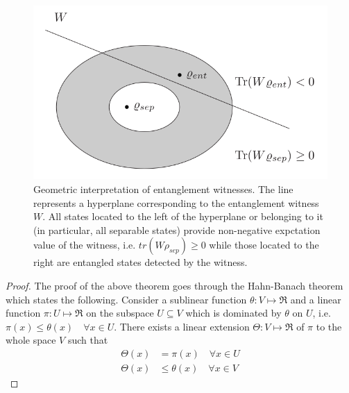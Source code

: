 \documentclass[10pt,a4paper]{book}
\numberwithin{equation}{chapter}
\numberwithin{figure}{chapter}
\numberwithin{table}{chapter}
\begin{document}
\begin{figure}[H]
    \begin{center}
        \includegraphics[scale=0.3]{ew.png}
    \end{center}
    \caption{\footnotesize Geometric interpretation of entanglement witnesses. The line represents a hyperplane corresponding to the entanglement witness $W$. All states located to the left of the hyperplane or belonging to it (in particular, all separable states) provide non-negative expctation value of the witness, i.e. $tr(W \rho_{sep}) \geqslant 0$ while those located to the right are entangled states detected by the witness. }
    \label{fig:ew}
\end{figure}

\begin{proof}
The proof of the above theorem goes through the Hahn-Banach theorem which states the following. Consider a sublinear function $\theta : V \longmapsto \Re$ and a linear function $\pi : U \longmapsto \Re$ on the subspace $U \subseteq V$ which is dominated by $\theta$ on $U$, i.e. $\pi (x) \leq \theta (x) \quad \forall x \in U$. There exists a linear extension $\Theta : V \longmapsto \Re$ of $\pi$ to the whole space $V$ such that
\begin{align}
\Theta (x)&=\pi (x) \quad \forall x \in U \\
\Theta (x)& \leq \theta (x) \quad \forall x \in V 
\end{align}
\end{proof}
\end{document}
